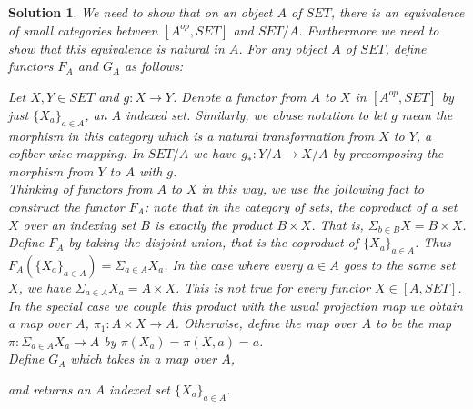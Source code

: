 \documentclass{article}
\theoremstyle{problemstyle}
\theoremstyle{problemstyle}
\theoremstyle{problemstyle}
\theoremstyle{problemstyle}
\theoremstyle{problemstyle}
\theoremstyle{problemstyle}
\newtheorem{solution}{Solution}
\theoremstyle{problemstyle}
\theoremstyle{problemstyle}
\begin{document}
\begin{solution}
We need to show that on an object $A$ of $SET$, there is an equivalence of small categories between $[A^{op}, SET]$ and $SET/A$. Furthermore we need to show that this equivalence is natural in $A$. 
For any object $A$ of $SET$, define functors $F_A$ and $G_A$ as follows: 

\begin{center}
\end{center}

Let $X,Y \in SET$ and $g:X \rightarrow Y$. Denote a functor from $A$ to $X$ in $[A^{op},SET]$ by just $\{X_a\}_{a \in A}$, an $A$ indexed set. Similarly, we abuse notation to let $g$ mean the morphism in this category which is a natural transformation from $X$ to $Y$, a cofiber-wise mapping. In $SET/A$ we have $g_*:Y/A \rightarrow X/A$ by precomposing the morphism from $Y$ to $A$ with $g$.\\ 

Thinking of functors from $A$ to $X$ in this way, we use the following fact to construct the functor $F_A$: note that in the category of sets, the coproduct of a set $X$ over an indexing set $B$ is exactly the product $B \times X$.  That is, $\Sigma_{b\in B}X = B \times X$.\\

Define $F_A$ by taking the disjoint union, that is the coproduct of $\{X_a\}_{a \in A}$. Thus $F_A(\{X_a\}_{a \in A}) = \Sigma_{a \in A}X_a$. In the case where every $a\in A$ goes to the same set $X$, we have $\Sigma_{a \in A}X_a = A \times X$. This is not true for every functor $X\in[A,SET]$. In the special case we couple this product with the usual projection map we obtain a map over $A$, $\pi_1:A \times X \rightarrow A$. Otherwise, define the map over $A$ to be the map $\pi:\Sigma_{a \in A}X_a\rightarrow A$ by $\pi(X_a) = \pi(X,a) = a$.\\ 

Define $G_A$ which takes in a map over $A$,  and returns an $A$ indexed set $\{X_a\}_{a \in A}$. 


\end{solution}
\end{document}

